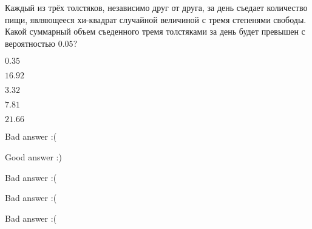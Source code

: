
\begin{question}
Каждый из трёх толстяков, независимо друг от друга, за день съедает
количество пищи, являющееся хи-квадрат случайной величиной с тремя
степенями свободы. Какой суммарный объем съеденного тремя толстяками за
день будет превышен с вероятностью \(0.05\)?
\begin{answerlist}
  \item \(0.35\)
  \item \(16.92\)
  \item \(3.32\)
  \item \(7.81\)
  \item \(21.66\)
\end{answerlist}
\end{question}

\begin{solution}
\begin{answerlist}
  \item Bad answer :(
  \item Good answer :)
  \item Bad answer :(
  \item Bad answer :(
  \item Bad answer :(
\end{answerlist}
\end{solution}

